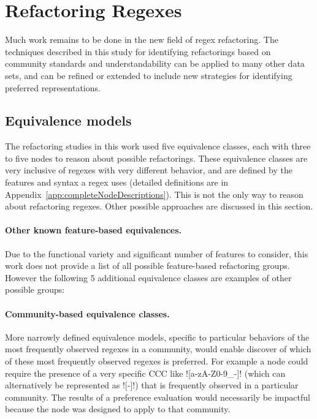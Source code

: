 \section{Refactoring Regexes}
Much work remains to be done in the new field of regex refactoring.  The techniques described in this study for identifying refactorings based on community standards and understandability can be applied to many other data sets, and can be refined or extended to include new strategies for identifying preferred representations.

\subsection{Equivalence models}
\label{dis:equivalenceModels}
The refactoring studies in this work used five equivalence classes, each with three to five nodes to reason about possible refactorings.  These equivalence classes are very inclusive of regexes with very different behavior, and are defined by the features and syntax a regex uses (detailed definitions are in Appendix~\ref{app:completeNodeDescriptions}).  This is not the only way to reason about refactoring regexes.  Other possible approaches are discussed in this section.

\paragraph{Other known feature-based equivalences.}  Due to the functional variety and significant number of features to consider, this work does not provide a list of all possible feature-based refactoring groups.  However the following 5 additional equivalence classes are examples of other possible groups:

\paragraph{Community-based equivalence classes.}  More narrowly defined equivalence models, specific to particular behaviors of the most frequently observed regexes in a community, would enable discover of which of these most frequently observed regexes is preferred. For example a node could require the presence of a very specific CCC like \cverb![a-zA-Z0-9_-]! (which can alternatively be represented as \cverb![\w-]!) that is frequently observed in a particular community.  The results of a preference evaluation would necessarily be impactful because the node was designed to apply to that community.

